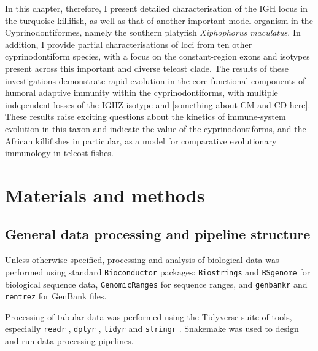 In this chapter, therefore, I present detailed characterisation of the IGH locus in the turquoise killifish, as well as that of another important model organism in the Cyprinodontiformes, namely the southern platyfish \textit{Xiphophorus maculatus}. In addition, I provide partial characterisations of loci from ten other cyprinodontiform species, with a focus on the constant-region exons and isotypes present across this important and diverse teleost clade. The results of these investigations demonstrate rapid evolution in the core functional components of humoral adaptive immunity within the cyprinodontiforms, with multiple independent losses of the IGHZ isotype and [something about CM and CD here]. These results raise exciting questions about the kinetics of immune-system evolution in this taxon and indicate the value of the cyprinodontiforms, and the African killifishes in particular, as a model for comparative evolutionary immunology in teleost fishes. 

\section{Materials and methods} %

\subsection{General data processing and pipeline structure}

Unless otherwise specified, processing and analysis of biological data was performed using standard \lstinline[language=R]{Bioconductor} \citep{huber2015bioconductor} packages: \lstinline[language=R]{Biostrings} \citep{pages2017biostrings} and \lstinline[language=R]{BSgenome} \citep{pages2018bsgenome} for biological sequence data, \lstinline[language=R]{GenomicRanges} \citep{lawrence2013genomicranges} for sequence ranges, and \lstinline[language=R]{genbankr} \citep{becker2018genbankr} and \lstinline[language=R]{rentrez} \citep{winter2017rentrez} for GenBank files.

Processing of tabular data was performed using the Tidyverse suite of tools, especially \lstinline[language=R]{readr} \citep{wickham2018readr}, \lstinline[language=R]{dplyr} \citep{wickham2018dplyr}, \lstinline[language=R]{tidyr} \citep{wickham2018tidyr} and \lstinline[language=R]{stringr} \citep{wickham2018stringr}. Snakemake \citep{koster2012snakemake} was used to design and run data-processing pipelines.

